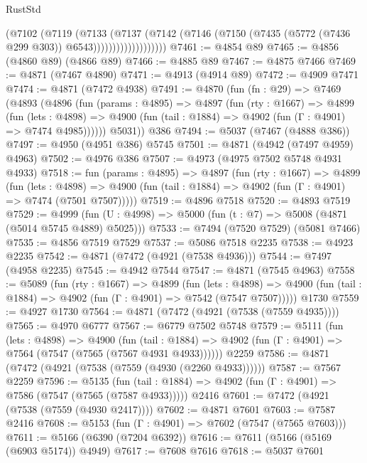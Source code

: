 \begin{lexlean}{RustStd}
\begin{coremodule}
{\begin{coremodule}
{{{{{{{{{{{{{{{{{{{{{{{{{{{{{                          (@7102
                            (@7119
                              (@7133
                                (@7137
                                  (@7142
                                    (@7146
                                      (@7150
                                        (@7435 (@5772 (@7436 @299 @303)) @6543)))))))))))))))))))
@7461 := @4854 @89
@7465 := @4856 (@4860 @89) (@4866 @89)
@7466 := @4885 @89
@7467 := @4875 @7466
@7469 := @4871 (@7467 @4890)
@7471 := @4913 (@4914 @89)
@7472 := @4909 @7471
@7474 := @4871 (@7472 @4938)
@7491 := @4870
    (fun (fn : @29) =>
    @7469
      (@4893
        (@4896
          (fun (params : @4895) =>
          @4897
            (fun (rty : @1667) =>
            @4899
              (fun (lets : @4898) =>
              @4900 (fun (tail : @1884) => @4902 (fun (Γ : @4901) => @7474 @4985))))))
        @5031))
    @386
@7494 := @5037 (@7467 (@4888 @386))
@7497 := @4950 (@4951 @386) @5745
@7501 := @4871 (@4942 (@7497 @4959) @4963)
@7502 := @4976 @386
@7507 := @4973 (@4975 @7502 @5748 @4931 @4933)
@7518 := fun (params : @4895) =>
  @4897
    (fun (rty : @1667) =>
    @4899
      (fun (lets : @4898) =>
      @4900 (fun (tail : @1884) => @4902 (fun (Γ : @4901) => @7474 (@7501 @7507)))))
@7519 := @4896 @7518
@7520 := @4893 @7519
@7529 := @4999 (fun (U : @4998) => @5000 (fun (t : @7) => @5008 (@4871 (@5014 @5745 @4889) @5025)))
@7533 := @7494 (@7520 @7529) (@5081 @7466)
@7535 := @4856 @7519 @7529
@7537 := @5086 @7518 @2235
@7538 := @4923 @2235
@7542 := @4871 (@7472 (@4921 (@7538 @4936)))
@7544 := @7497 (@4958 @2235)
@7545 := @4942 @7544
@7547 := @4871 (@7545 @4963)
@7558 := @5089
    (fun (rty : @1667) =>
    @4899
      (fun (lets : @4898) =>
      @4900 (fun (tail : @1884) => @4902 (fun (Γ : @4901) => @7542 (@7547 @7507)))))
    @1730
@7559 := @4927 @1730
@7564 := @4871 (@7472 (@4921 (@7538 (@7559 @4935))))
@7565 := @4970 @6777
@7567 := @6779 @7502 @5748
@7579 := @5111
    (fun (lets : @4898) =>
    @4900
      (fun (tail : @1884) => @4902 (fun (Γ : @4901) => @7564 (@7547 (@7565 (@7567 @4931 @4933))))))
    @2259
@7586 := @4871 (@7472 (@4921 (@7538 (@7559 (@4930 (@2260 @4933))))))
@7587 := @7567 @2259
@7596 := @5135
    (fun (tail : @1884) => @4902 (fun (Γ : @4901) => @7586 (@7547 (@7565 (@7587 @4933)))))
    @2416
@7601 := @7472 (@4921 (@7538 (@7559 (@4930 @2417))))
@7602 := @4871 @7601
@7603 := @7587 @2416
@7608 := @5153 (fun (Γ : @4901) => @7602 (@7547 (@7565 @7603)))
@7611 := @5166 (@6390 (@7204 @6392))
@7616 := @7611 (@5166 (@5169 (@6903 @5174)) @4949)
@7617 := @7608 @7616
@7618 := @5037 @7601
}}}}}}}}}}}}}}}}}}}}}}}}}}}}}
\end{coremodule}}
\end{coremodule}
\end{lexlean}
